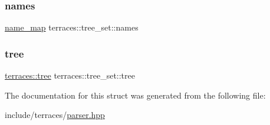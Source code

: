 \subsubsection{\texorpdfstring{names}{names}}
{\footnotesize\ttfamily \hyperlink{namespaceterraces_a4ef0217fe5aed881737d9bc5a8d45dca}{name\+\_\+map} terraces\+::tree\+\_\+set\+::names}

\mbox{\label{structterraces_1_1tree__set_abdce12c87cab9633ad5f8ae735ce6007}} 
\subsubsection{\texorpdfstring{tree}{tree}}
{\footnotesize\ttfamily \hyperlink{namespaceterraces_a07aaf7feec4a22c6cdefc14c5a81bdd0}{terraces\+::tree} terraces\+::tree\+\_\+set\+::tree}



The documentation for this struct was generated from the following file\+:\begin{DoxyCompactItemize}
\item 
include/terraces/\hyperlink{parser_8hpp}{parser.\+hpp}\end{DoxyCompactItemize}
